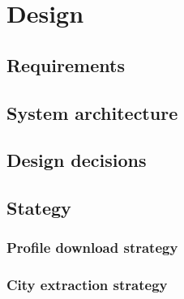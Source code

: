 \chapter{Design}

\section{Requirements}

\section{System architecture}

\section{Design decisions}

\section{Stategy}
\subsection{Profile download strategy}
\subsection{City extraction strategy}

